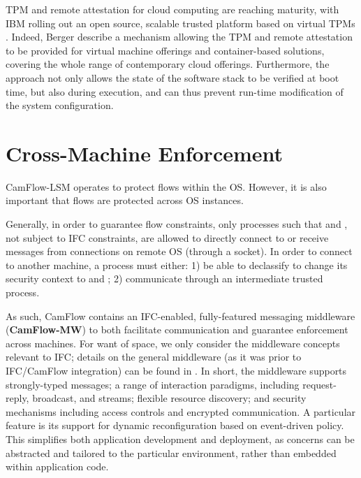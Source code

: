 \documentclass[10pt,journal,compsoc]{IEEEtran}
\begin{document}
TPM and remote attestation for cloud computing \cite{perez2006vtpm} are reaching maturity, with IBM rolling out an open source, scalable trusted platform based on virtual TPMs \cite{BergerIC2E2015}. 
Indeed, Berger \etal \cite{BergerIC2E2015} describe a mechanism allowing the TPM and remote attestation to be provided for virtual machine offerings and container-based solutions, covering the whole range of contemporary cloud offerings.
Furthermore, the approach not only allows the state of the software stack to be verified at boot time, but also during execution, and can thus prevent run-time modification of the system configuration.



 
\section{Cross-Machine Enforcement}
\label{sec:mw}











CamFlow-LSM operates to protect flows within the OS. However, it is also important that flows are protected across OS instances.

Generally, in order to guarantee flow constraints, only processes  such that  and , \ie not subject to IFC constraints, are allowed to directly connect to or receive messages from  connections on remote OS (\eg through a socket). In order to connect to another machine, a process must either:
1) be able to declassify to change its security context to  and ;
2) communicate through an intermediate trusted process.


As such, CamFlow contains an IFC-enabled, fully-featured messaging middleware (\textbf{CamFlow-MW}) to 
both facilitate communication and guarantee enforcement across machines.
For want of space, we only consider the middleware concepts relevant to IFC; details on the general middleware (as it was prior to IFC\slash CamFlow integration) can be found in \cite{debs14SBUStutorial}.
In short, the middleware supports strongly-typed messages; a range of interaction paradigms, including request-reply, broadcast, and streams; flexible resource discovery; and security mechanisms including access controls and encrypted communication. 
A particular feature is its support for dynamic reconfiguration based on event-driven policy. This simplifies both application development and deployment, as concerns can be abstracted and tailored to the particular environment, rather than embedded within application code.
\end{document}
